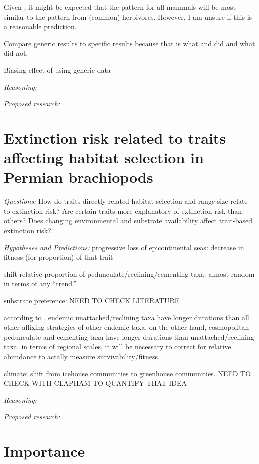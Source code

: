 \documentclass[12pt,letterpaper]{article}
\begin{document}
Given \citep{Jernvall2002}, it might be expected that the pattern for all mammals will be most similar to the pattern from (common) herbivores. However, I am unsure if this is a reasonable prediction.

Compare generic results to specific results because that is what \citet{Jernvall2002} and \citet{Jernvall2004} did and what \citet{Tomiya2013} did not.

Biasing effect of using generic data \citep{Raup1975}

\textit{Reasoning:}

\textit{Proposed research:}


\section{Extinction risk related to traits affecting habitat selection in Permian brachiopods}

\textit{Questions:} How do traits directly related habitat selection and range size relate to extinction risk? Are certain traits more explanatory of extinction risk than others? Does changing environmental and substrate availability affect trait-based extinction risk?

\textit{Hypotheses and Predictions:}
progressive loss of epicontinental seas: decrease in fitness (for proportion) of that trait

shift relative proportion of pedunculate/reclining/cementing taxa: almost random \citep{Clapham2007} in terms of any ``trend.'' 

substrate preference: NEED TO CHECK LITERATURE

according to \citet{Alexander1977}, endemic unattached/reclining taxa have longer durations than all other affixing strategies of other endemic taxa. on the other hand, cosmopolitan pedunculate and cementing taxa have longer durations than unattached/reclining taxa. in terms of regional scales, it will be necessary to correct for relative abundance to actally measure survivability/fitness.

climate: shift from icehouse communities to greenhouse communities. NEED TO CHECK WITH CLAPHAM TO QUANTIFY THAT IDEA


\textit{Reasoning:}

\textit{Proposed research:}



\section{Importance}
\end{document}
